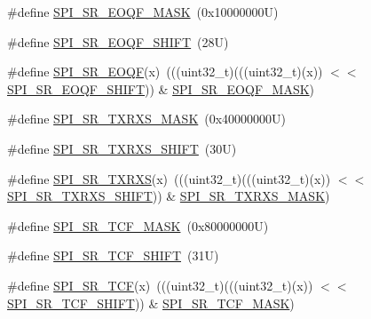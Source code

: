 \begin{DoxyCompactItemize}
\item 
\#define \mbox{\hyperlink{group___s_p_i___register___masks_gaf90e19a9b8d8a54d8ae278820d8f1558}{S\+P\+I\+\_\+\+S\+R\+\_\+\+E\+O\+Q\+F\+\_\+\+M\+A\+SK}}~(0x10000000\+U)
\item 
\#define \mbox{\hyperlink{group___s_p_i___register___masks_ga0395371ab4e76da4f99c89bc6963e816}{S\+P\+I\+\_\+\+S\+R\+\_\+\+E\+O\+Q\+F\+\_\+\+S\+H\+I\+FT}}~(28\+U)
\item 
\#define \mbox{\hyperlink{group___s_p_i___register___masks_ga78a6c798b522222613b13ff15bc0a19c}{S\+P\+I\+\_\+\+S\+R\+\_\+\+E\+O\+QF}}(x)~(((uint32\+\_\+t)(((uint32\+\_\+t)(x)) $<$$<$ \mbox{\hyperlink{group___s_p_i___register___masks_ga0395371ab4e76da4f99c89bc6963e816}{S\+P\+I\+\_\+\+S\+R\+\_\+\+E\+O\+Q\+F\+\_\+\+S\+H\+I\+FT}})) \& \mbox{\hyperlink{group___s_p_i___register___masks_gaf90e19a9b8d8a54d8ae278820d8f1558}{S\+P\+I\+\_\+\+S\+R\+\_\+\+E\+O\+Q\+F\+\_\+\+M\+A\+SK}})
\item 
\#define \mbox{\hyperlink{group___s_p_i___register___masks_ga82001e6d6fa1c1e51ab330a4d6b209c5}{S\+P\+I\+\_\+\+S\+R\+\_\+\+T\+X\+R\+X\+S\+\_\+\+M\+A\+SK}}~(0x40000000\+U)
\item 
\#define \mbox{\hyperlink{group___s_p_i___register___masks_ga596b82d7dd4fe7f24ea66c19a9413b96}{S\+P\+I\+\_\+\+S\+R\+\_\+\+T\+X\+R\+X\+S\+\_\+\+S\+H\+I\+FT}}~(30\+U)
\item 
\#define \mbox{\hyperlink{group___s_p_i___register___masks_gac82b2f662a1fdec456fa374282d26d5d}{S\+P\+I\+\_\+\+S\+R\+\_\+\+T\+X\+R\+XS}}(x)~(((uint32\+\_\+t)(((uint32\+\_\+t)(x)) $<$$<$ \mbox{\hyperlink{group___s_p_i___register___masks_ga596b82d7dd4fe7f24ea66c19a9413b96}{S\+P\+I\+\_\+\+S\+R\+\_\+\+T\+X\+R\+X\+S\+\_\+\+S\+H\+I\+FT}})) \& \mbox{\hyperlink{group___s_p_i___register___masks_ga82001e6d6fa1c1e51ab330a4d6b209c5}{S\+P\+I\+\_\+\+S\+R\+\_\+\+T\+X\+R\+X\+S\+\_\+\+M\+A\+SK}})
\item 
\#define \mbox{\hyperlink{group___s_p_i___register___masks_ga3142ac7389c847b78c8f42e6bad5eec1}{S\+P\+I\+\_\+\+S\+R\+\_\+\+T\+C\+F\+\_\+\+M\+A\+SK}}~(0x80000000\+U)
\item 
\#define \mbox{\hyperlink{group___s_p_i___register___masks_ga4edd10f93f07c7b2edfbac31c1d4ebf5}{S\+P\+I\+\_\+\+S\+R\+\_\+\+T\+C\+F\+\_\+\+S\+H\+I\+FT}}~(31\+U)
\item 
\#define \mbox{\hyperlink{group___s_p_i___register___masks_gaef8ce3128f64525ab4aead7fc9fd4c60}{S\+P\+I\+\_\+\+S\+R\+\_\+\+T\+CF}}(x)~(((uint32\+\_\+t)(((uint32\+\_\+t)(x)) $<$$<$ \mbox{\hyperlink{group___s_p_i___register___masks_ga4edd10f93f07c7b2edfbac31c1d4ebf5}{S\+P\+I\+\_\+\+S\+R\+\_\+\+T\+C\+F\+\_\+\+S\+H\+I\+FT}})) \& \mbox{\hyperlink{group___s_p_i___register___masks_ga3142ac7389c847b78c8f42e6bad5eec1}{S\+P\+I\+\_\+\+S\+R\+\_\+\+T\+C\+F\+\_\+\+M\+A\+SK}})
\end{DoxyCompactItemize}

